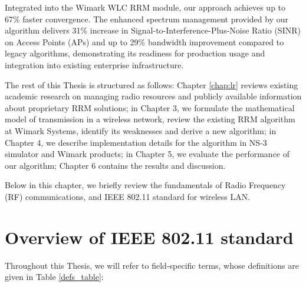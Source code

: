 Integrated into the Wimark WLC RRM module, our approach achieves up to 67\% faster convergence. The enhanced spectrum management provided by our algorithm delivers 31\% increase in Signal-to-Interference-Plus-Noise Ratio (SINR) on Access Points (APs) and up to 29\% bandwidth improvement compared to legacy algorithms, demonstrating its readiness for production usage and integration into existing enterprise infrastructure.




The rest of this Thesis is structured as follows: Chapter \ref{chap:lr} reviews existing academic research on managing radio resources and publicly available information about proprietary RRM solutions; in Chapter 3, we formulate the mathematical model of transmission in a wireless network, review the existing RRM algorithm at Wimark Systems, identify its weaknesses and derive a new algorithm; in Chapter 4, we describe implementation details for the algorithm in NS-3 simulator and Wimark products; in Chapter 5, we evaluate the performance of our algorithm; Chapter 6 contains the results and discussion.



Below in this chapter, we briefly review the fundamentals of Radio Frequency (RF) communications, and IEEE 802.11 standard for wireless LAN.

\section{Overview of IEEE 802.11 standard}

Throughout this Thesis, we will refer to field-specific terms, whose definitions are given in Table \ref{defs_table}:

